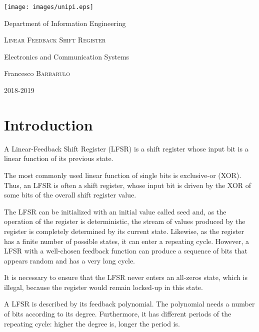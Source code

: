 \documentclass[11pt,a4paper,oneside, openright]{article}
\begin{document}
{
  \begin{titlepage}
  	\centering
  	\texttt{[image: images/unipi.eps]}\par
  	\vspace{1cm}
    {\Large Department of Information Engineering \par}
  	\vspace{2cm}
  	{\huge\textsc{Linear Feedback Shift Register}\par}
    \vspace{0.5cm}
  	{\Large Electronics and Communication Systems\par}
  	\vspace{2cm}
  	{\Large Francesco \textsc{Barbarulo}\par}

  	\vfill

  	{\large 2018-2019\par}
  \end{titlepage}
}


\tableofcontents

\newpage

\section{Introduction}
A Linear-Feedback Shift Register (LFSR) is a shift register whose input bit is a linear function of its previous state.

The most commonly used linear function of single bits is exclusive-or (XOR). Thus, an LFSR is often a shift register, whose input bit is driven by the XOR of some bits of the overall shift register value.

The LFSR can be initialized with an initial value called seed and, as the operation of the register is deterministic, the stream of values produced by the register is completely determined by its current state. Likewise, as the register has a finite number of possible states, it can enter a repeating cycle. However, a LFSR with a well-chosen feedback function can produce a sequence of bits that appears random and has a very long cycle.

It is necessary to ensure that the LFSR never enters an all-zeros state, which is illegal, because the register would remain locked-up in this state.

A LFSR is described by its feedback polynomial. The polynomial needs a number of bits according to its degree. Furthermore, it has different periods of the repeating cycle: higher the degree is, longer the period is.
\end{document}
